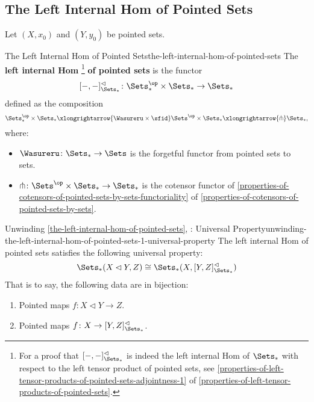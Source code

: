 \subsection{The Left Internal Hom of Pointed Sets}\label{subsection-the-left-internal-hom-of-pointed-sets}
Let $(X,x_{0})$ and $(Y,y_{0})$ be pointed sets.
\begin{definition}{The Left Internal Hom of Pointed Sets}{the-left-internal-hom-of-pointed-sets}%
    The \textbf{left internal Hom}%
    \footnote{%
        For a proof that $[-,-]^{\lhd}_{\Sets_{*}}$ is indeed the left internal Hom of $\Sets_{*}$ with respect to the left tensor product of pointed sets, see \cref{properties-of-left-tensor-products-of-pointed-sets-adjointness-1} of \cref{properties-of-left-tensor-products-of-pointed-sets}.
        \par\vspace*{\TCBBoxCorrection}
    } %
    \textbf{of pointed sets} is the functor%
    \[
        [-,-]^{\lhd}_{\Sets_{*}}%
        \colon%
        \Sets^{\op}_{*}\times\Sets_{*}%
        \to%
        \Sets_{*}%
    \]%
    defined as the composition
    \[
        \Sets^{\op}_{*}\times\Sets_{*}%
        \xlongrightarrow{\Wasureru\times\sfid}%
        \Sets^{\op}\times\Sets_{*}%
        \xlongrightarrow{\pitchfork}%
        \Sets_{*},%
    \]%
    where:
    \begin{itemize}
        \item $\Wasureru\colon\Sets_{*}\to\Sets$ is the forgetful functor from pointed sets to sets.
        \item $\pitchfork\colon\Sets^{\op}\times\Sets_{*}\to\Sets_{*}$ is the cotensor functor of \cref{properties-of-cotensors-of-pointed-sets-by-sets-functoriality} of \cref{properties-of-cotensors-of-pointed-sets-by-sets}.%
    \end{itemize}
\end{definition}
\begin{remark}{Unwinding \cref{the-left-internal-hom-of-pointed-sets}, \rmI: Universal Property}{unwinding-the-left-internal-hom-of-pointed-sets-1-universal-property}%
    The left internal Hom of pointed sets satisfies the following universal property:%
    \[%
        \Sets_{*}(X\lhd Y,Z)%
        \cong%
        \Sets_{*}(X,[Y,Z]^{\lhd}_{\Sets_{*}})%
    \]%
    That is to say, the following data are in bijection:
    \begin{enumerate}
        \item\label{unwinding-the-left-internal-hom-of-pointed-sets-1-universal-property-item-1}Pointed maps $f\colon X\lhd Y\to Z$.
        \item\label{unwinding-the-left-internal-hom-of-pointed-sets-1-universal-property-item-2}Pointed maps $f\colon X\to[Y,Z]^{\lhd}_{\Sets_{*}}$.
    \end{enumerate}
\end{remark}
